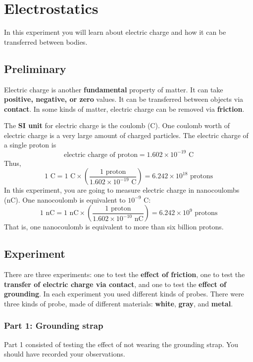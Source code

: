\setcounter{chapter}{0}
\chapter{Electrostatics}
%
In this experiment you will learn about electric charge and how it can be transferred between bodies.
%
\section{Preliminary}
%
Electric charge is another \textbf{fundamental} property of matter. It can take \textbf{positive, negative, or zero} values. It can be transferred between objects via \textbf{contact}. In some kinds of matter, electric charge can be removed via \textbf{friction}.

The \textbf{SI unit} for electric charge is the coulomb (C). One coulomb worth of electric charge is a very large amount of charged particles. The electric charge of a single proton is
\begin{equation}
	\text{electric charge of proton} = 1.602 \times 10^{-19} \text{ C}
\end{equation}
Thus,
\begin{equation}
	1 \text{ C} = 1 \text{ C} \times \left(\frac{1 \text{ proton}}{1.602 \times 10^{-19} \text{ C}}\right) = 6.242 \times 10^{18} \text{ protons}
\end{equation}
In this experiment, you are going to measure electric charge in nanocoulombs (nC). One nanocoulomb is equivalent to $10^{-9}$ C:
\begin{equation}
	1 \text{ nC} = 1 \text{ nC} \times \left(\frac{1 \text{ proton}}{1.602 \times 10^{-10} \text{ nC}}\right) = 6.242 \times 10^{9} \text{ protons}
\end{equation}
That is, one nanocoulomb is equivalent to more than six billion protons.
%
\section{Experiment}
%
There are three experiments: one to test the \textbf{effect of friction}, one to test the \textbf{transfer of electric charge via contact}, and one to test the \textbf{effect of grounding}. In each experiment you used different kinds of probes. There were three kinds of probe, made of different materials: \textbf{white}, \textbf{gray}, and \textbf{metal}.
%
\subsection{Part 1: Grounding strap}
%
Part 1 consisted of testing the effect of not wearing the grounding strap. You should have recorded your observations.
%
